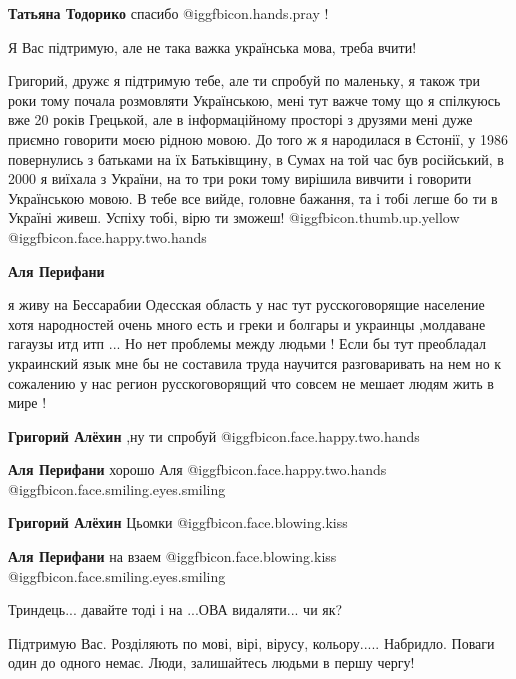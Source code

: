 \begin{itemize}
\begin{itemize} %
\textbf{Татьяна Тодорико} спасибо  @igg{fbicon.hands.pray}  !
\end{itemize} %

Я Вас підтримую, але не така важка українська мова, треба вчити!


Григорий, дружє я підтримую тебе, але ти спробуй по маленьку, я також три роки
тому почала розмовляти Українською, мені тут важче тому що я спілкуюсь вже 20
років Грецькой, але в інформаційному просторі з друзями мені дуже приємно
говорити моєю рідною мовою. До того ж я народилася в Єстонії, у 1986 повернулись
з батьками на їх Батьківщину, в Сумах на той час був російський, в 2000 я
виїхала з України, на то три роки тому вирішила вивчити і говорити Українською
мовою. В тебе все вийде, головне бажання, та і тобі легше бо ти в Україні
живеш. Успіху тобі, вірю ти зможеш! @igg{fbicon.thumb.up.yellow}  @igg{fbicon.face.happy.two.hands} 

\begin{itemize} %
\textbf{Аля Перифани} 

я живу на Бессарабии Одесская область у нас тут русскоговорящие население хотя
народностей очень много есть и греки и болгары и украинцы ,молдаване гагаузы
итд итп ... Но нет проблемы между людьми ! Если бы тут преобладал украинский
язык мне бы не составила труда научится разговаривать на нем но к сожалению у
нас регион русскоговорящий что совсем не мешает людям жить в мире !

\textbf{Григорий Алёхин} ,ну ти спробуй  @igg{fbicon.face.happy.two.hands} 

\textbf{Аля Перифани} хорошо Аля  @igg{fbicon.face.happy.two.hands}  @igg{fbicon.face.smiling.eyes.smiling} 

\textbf{Григорий Алёхин} Цьомки  @igg{fbicon.face.blowing.kiss} 

\textbf{Аля Перифани} на взаем  @igg{fbicon.face.blowing.kiss}  @igg{fbicon.face.smiling.eyes.smiling} 
\end{itemize} %

Триндець... давайте тоді і на ...ОВА видаляти... чи як?


Підтримую Вас. Розділяють по мові, вірі, вірусу, кольору..... Набридло. Поваги
один до одного немає. Люди, залишайтесь людьми в першу чергу!


\end{itemize}
